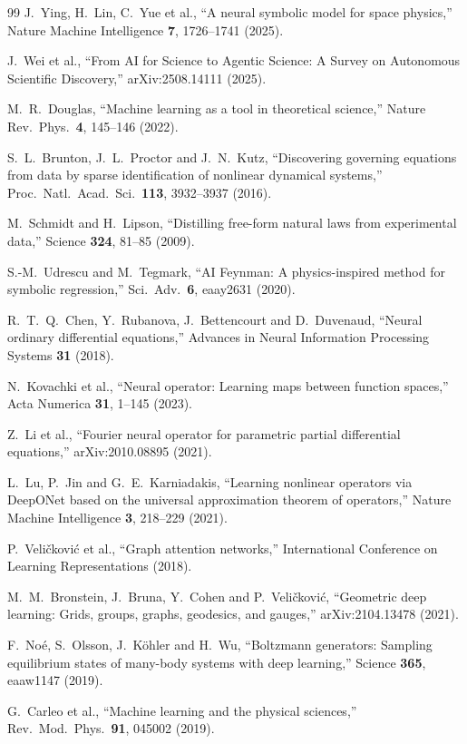 \documentclass[11pt,a4paper,oneside]{book}
\begin{document}
\begin{thebibliography}{99}
J.~Ying, H.~Lin, C.~Yue et al.,
``A neural symbolic model for space physics,''
Nature Machine Intelligence \textbf{7}, 1726--1741 (2025).

J.~Wei et al.,
``From AI for Science to Agentic Science:
A Survey on Autonomous Scientific Discovery,''
arXiv:2508.14111 (2025).

M.~R.~Douglas,
``Machine learning as a tool in theoretical science,''
Nature Rev.\ Phys.\ \textbf{4}, 145--146 (2022).

S.~L.~Brunton, J.~L.~Proctor and J.~N.~Kutz,
``Discovering governing equations from data by sparse identification of
nonlinear dynamical systems,''
Proc.\ Natl.\ Acad.\ Sci.\ \textbf{113}, 3932--3937 (2016).

M.~Schmidt and H.~Lipson,
``Distilling free-form natural laws from experimental data,''
Science \textbf{324}, 81--85 (2009).

S.-M.~Udrescu and M.~Tegmark,
``AI Feynman: A physics-inspired method for symbolic regression,''
Sci.\ Adv.\ \textbf{6}, eaay2631 (2020).

R.~T.~Q.~Chen, Y.~Rubanova, J.~Bettencourt and D.~Duvenaud,
``Neural ordinary differential equations,''
Advances in Neural Information Processing Systems \textbf{31} (2018).

N.~Kovachki et al.,
``Neural operator: Learning maps between function spaces,''
Acta Numerica \textbf{31}, 1--145 (2023).

Z.~Li et al.,
``Fourier neural operator for parametric partial differential equations,''
arXiv:2010.08895 (2021).

L.~Lu, P.~Jin and G.~E.~Karniadakis,
``Learning nonlinear operators via DeepONet based on the universal
approximation theorem of operators,''
Nature Machine Intelligence \textbf{3}, 218--229 (2021).

P.~Veli\v{c}kovi\'c et al.,
``Graph attention networks,''
International Conference on Learning Representations (2018).

M.~M.~Bronstein, J.~Bruna, Y.~Cohen and P.~Veli\v{c}kovi\'c,
``Geometric deep learning: Grids, groups, graphs, geodesics, and gauges,''
arXiv:2104.13478 (2021).

F.~No\'e, S.~Olsson, J.~K\"ohler and H.~Wu,
``Boltzmann generators: Sampling equilibrium states of many-body systems
with deep learning,''
Science \textbf{365}, eaaw1147 (2019).

G.~Carleo et al.,
``Machine learning and the physical sciences,''
Rev.\ Mod.\ Phys.\ \textbf{91}, 045002 (2019).

\end{thebibliography}

\printindex
\end{document}
